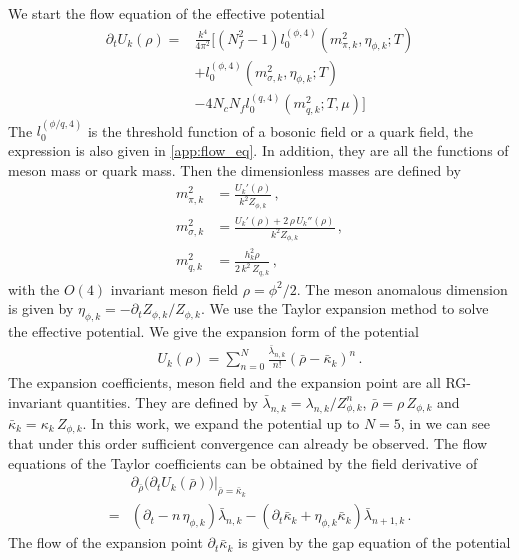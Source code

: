 \documentclass[aps,twocolumn,prd,superscriptaddress,nofootinbib,floatfix]{revtex4-2}
\def\Eq#1{\Cref{#1}}
\begin{document}
We start the flow equation of the effective potential
%
\begin{align}\label{eq:u_flow}
\partial_t U_k(\rho)=&\frac{k^4}{4\pi^2}\bigg[(N_f^2-1)l^{(\phi,4)}_0(m^2_{\pi,k},\eta_{\phi,k};T)\nonumber\\[2ex]
&+l^{(\phi,4)}_0(m^2_{\sigma,k},\eta_{\phi,k};T)\nonumber\\[2ex]
&-4N_cN_fl^{(q,4)}_0(m^2_{q,k};T,\mu)\bigg]
\end{align}
%
The $l^{(\phi/q,4)}_0$ is the threshold function of a bosonic field or a quark field, the expression is also given in \cref{app:flow_eq}. In addition, they are all the functions of meson mass or quark mass. Then the dimensionless masses are defined by
%
\begin{align}
m^2_{\pi,k}&=\frac{U_k'(\rho)}{k^2Z_{\phi,k}}\,,\\[2ex]
m^2_{\sigma,k}&=\frac{U_k'(\rho)+2\,\rho\,U_k''(\rho)}{k^2Z_{\phi,k}}\,,\\[2ex]
m^2_{q,k}&=\frac{h_k^2\rho}{2\,k^2\,Z_{q,k}}\,,
\end{align}
%
with the $O(4)$ invariant meson field $\rho=\phi^2/2$. The meson anomalous dimension is given by $\eta_{\phi,k}=-\partial_tZ_{\phi,k}/Z_{\phi,k}$. We use the Taylor expansion method to solve the effective potential. We give the expansion form of the potential
%
\begin{align}
U_k(\rho)=\sum^N_{n=0}\frac{\bar\lambda_{n,k}}{n!}(\bar\rho-\bar\kappa_k)^n\,.
\end{align}
%
The expansion coefficients, meson field and the expansion point are all RG-invariant quantities. They are defined by $\bar\lambda_{n,k}=\lambda_{n,k}/Z^n_{\phi,k}$, $\bar{\rho}=\rho\,Z_{\phi,k}$ and $\bar{\kappa}_k=\kappa_k\,Z_{\phi,k}$. In this work, we expand the potential up to $N=5$, in \cite{Yin:2019ebz,Pawlowski:2014zaa} we can see that under this order sufficient convergence can already be observed. The flow equations of the Taylor coefficients can be obtained by the field derivative of \Eq{eq:u_flow}
%
\begin{align}\label{eq:flow_coef}
&\partial_{\bar\rho}\Big(\partial_tU_k(\bar\rho)\Big)\bigg|_{\bar\rho=\bar\kappa_k}\nonumber\\[2ex]
=&(\partial_t-n\,\eta_{\phi,k})\bar{\lambda}_{n,k}-(\partial_t\bar{\kappa}_k+\eta_{\phi,k}\bar{\kappa}_k)\bar{\lambda}_{n+1,k}\,.
\end{align}
%
The flow of the expansion point $\partial_t\bar{\kappa}_k$ is given by the gap equation of the potential
\end{document}
